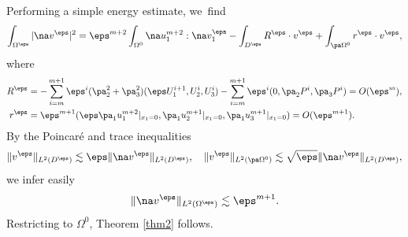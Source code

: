 Performing a simple energy estimate, we~find
\begin{align*}
\int_{\Omega^\eps} |\na v^\eps|^2 = \eps^{m+2} \int_{\Omega^0} \na u_1^{m+2} : \na v_1^\eps - \int_{D^\eps} R^\eps \cdot v^\eps + \int_{\pa \Omega^0} r^\eps \cdot v^\eps,
\end{align*}
where
\begin{align*}
R^\eps & = - \sum_{i=m}^{m+1} \eps^i (\pa^2_2 + \pa^2_3) (\eps U^{i+1}_1,U^i_2,U^i_3) - \sum_{i=m}^{m+1} \eps^i (0, \pa_2 P^i, \pa_3 P^i) = O(\eps^m), \\
r^\eps & = \eps^{m+1}(\eps \pa_1 u^{m+2}_1\vert_{x_1=0},\pa_1 u^{m+1}_2\vert_{x_1=0}, \pa_1 u^{m+1}_3\vert_{x_1=0}) = O(\eps^{m+1}).
\end{align*}
By the Poincaré and trace inequalities
\[
\| v^\eps \|_{L^2(D^\eps)} \lesssim \eps \|\na v^\eps \|_{L^2(D^\eps)}, \quad \| v^\eps \|_{L^2(\pa\Omega^0)} \lesssim \sqrt{\eps} \|\na v^\eps \|_{L^2(D^\eps)},
\]
we infer easily
\[
\|\na v^\eps \|_{L^2(\Omega^\eps)} \lesssim \eps^{m+1}.
\]
Restricting to $\Omega^0$, Theorem \ref{thm2} follows.

